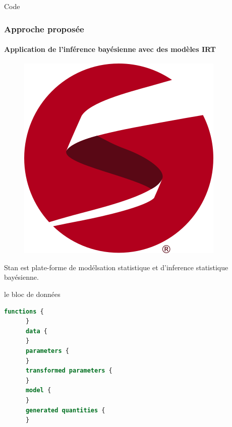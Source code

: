 \documentclass[aspectratio=169,professionalfonts, 12pt]{beamer}
\begin{document}
\begin{frame}{Code}
  \frametitle{Approche proposée}
  \framesubtitle{Application de l'inférence bayésienne avec des modèles IRT}
  \begin{minipage}{0.3\textwidth}
    \begin{figure}[t]
      \begin{center}
        \includegraphics[scale=0.3]{images/contribution/stan.png}
      \end{center}
    \end{figure}
    \begin{block}{}
      Stan est plate-forme de modélsation statistique et d'inference statistique bayésienne.
    \end{block}
  \end{minipage}
  \begin{minipage}{1mm}
  \hspace{1mm}
  \end{minipage}
  \begin{minipage}{0.5\textwidth}
    \begin{block}{le bloc de données}
      \begin{lstlisting}[language=Stan,basicstyle=\scriptsize,tabsize=1,framesep=0pt,framexleftmargin=0pt,xleftmargin=0pt,xrightmargin=0pt,breakindent=0pt,resetmargins=true]
      functions {
      }
      data {
      }
      parameters {
      }
      transformed parameters {
      }
      model {
      }
      generated quantities {
      }
      \end{lstlisting}
      \end{block}
  \end{minipage}	
\end{frame}
\end{document}
